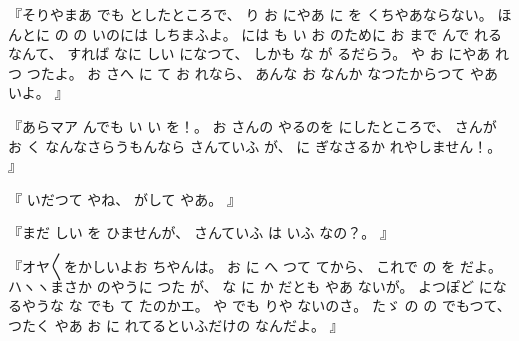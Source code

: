 『そりやまあ
でも
としたところで、
%
り
お
にやあ
に
を
くちやあならない。
%
ほんとに
の
の
いのには
しちまふよ。
%
には
も
い
お
のために
お
まで
んで
れるなんて、
%
すれば
なに
しい
になつて、
%
しかも
な
が
るだらう。
%
や
お
にやあ
れつ
つたよ。
%
お
さへ
に
て
お
れなら、
%
あんな
お
なんか
なつたからつて
やあ
いよ。
』

『あらマア
んでも
い
い
を！。
%
お
さんの
やるのを
にしたところで、
%
さんが
お
く
なんなさらうもんなら
さんていふ
が、
%
に
ぎなさるか
れやしません！。
』

『
いだつて
やね、
%
がして
やあ。
』

『まだ
しい
を
ひませんが、
%
さんていふ
は
いふ
なの？。
』

『オヤ〳〵をかしいよお
ちやんは。
%
お
に
へ
つて
てから、
%
これで
の
を
だよ。
%
ハヽヽまさか
のやうに
つた
が、
%
な
に
か
だとも
やあ
ないが。
%
よつぽど
になるやうな
な
でも
て
たのかエ。
%
や
でも
りや
ないのさ。
%
たゞ
の
の
でもつて、
%
つたく
やあ
お
に
れてるといふだけの
なんだよ。
』

